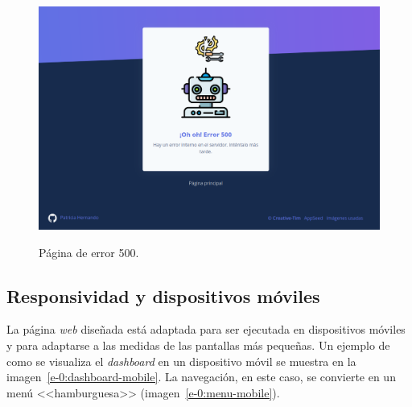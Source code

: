 \begin{figure}[h]
	\caption[Manual de usuario: error 500]{Página de error 500.}
	\centering
	\includegraphics[width=\textwidth]{../img/anexos/user_guide/0_error_500}
	\label{e-0:error-500}
\end{figure}


\subsection{Responsividad y dispositivos móviles}

La página \textit{web} diseñada está adaptada para ser ejecutada en dispositivos móviles y para adaptarse a las medidas de las pantallas más pequeñas. Un ejemplo de como se visualiza el \textit{dashboard} en un dispositivo móvil se muestra en la imagen~\ref{e-0:dashboard-mobile}. La navegación, en este caso, se convierte en un menú <<hamburguesa>> (imagen~\ref{e-0:menu-mobile}).


